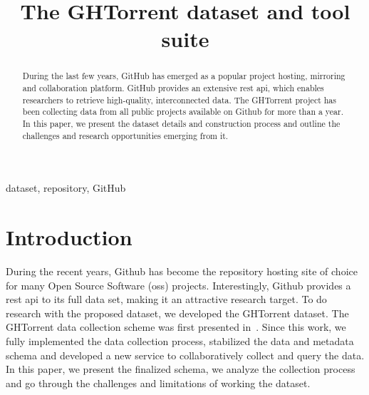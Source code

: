 \documentclass[conference]{IEEEtran}
\begin{document}
\title{The GHTorrent dataset and tool suite}

\author{ 
}

\maketitle

\begin{abstract} 
  
  During the last few years, GitHub has emerged as a popular project hosting,
  mirroring and collaboration platform. GitHub provides an extensive {\sc rest
  api}, which enables researchers to retrieve high-quality, interconnected data.
  The GHTorrent project has been collecting data from all public projects
  available on Github for more than a year. In this paper, we present the dataset
  details and construction process and outline the challenges and research
  opportunities emerging from it.

\end{abstract}

\begin{IEEEkeywords}
dataset, repository, GitHub
\end{IEEEkeywords}

\section{Introduction} During the recent years, Github has become the repository
hosting site of choice for many Open Source Software ({\sc oss}) projects.
Interestingly, Github provides a {\sc rest api} to its full data set, making it
an attractive research target. To do research with the proposed dataset, we
developed the GHTorrent dataset. The GHTorrent data collection scheme was first
presented in~\cite{GS12}. Since this work, we fully implemented the data
collection process, stabilized the data and metadata schema and developed a new
service to collaboratively collect and query the data. In this paper, we present
the finalized schema, we analyze the collection process and go through the
challenges and limitations of working the dataset.
\end{document}
